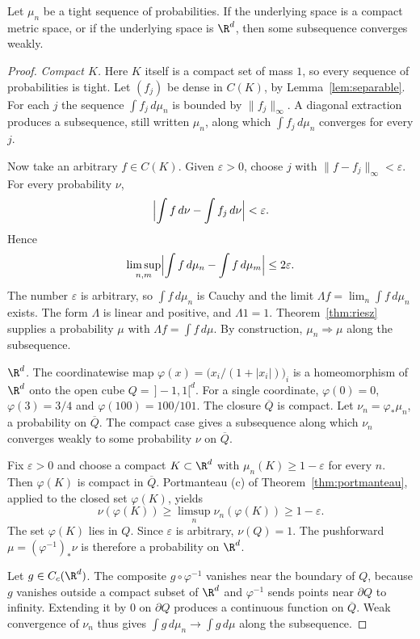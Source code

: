 \begin{theorem}[Prokhorov]\label{thm:prokhorov}
Let $\mu_n$ be a tight sequence of probabilities. If the underlying space is a compact metric space, or if the underlying space is $\R^d$,
then some subsequence converges weakly.
\end{theorem}
\begin{proof}
\emph{Compact $K$.} Here $K$ itself is a compact set of mass $1$, so every sequence of probabilities is tight. Let $(f_j)$ be dense in
$C(K)$, by Lemma~\ref{lem:separable}. For each $j$ the sequence $\int f_j\,d\mu_n$ is bounded by $\|f_j\|_\infty$. A diagonal extraction
produces a subsequence, still written $\mu_n$, along which $\int f_j\,d\mu_n$ converges for every $j$.

Now take an arbitrary $f\in C(K)$. Given $\varepsilon>0$, choose $j$ with $\|f-f_j\|_\infty<\varepsilon$. For every probability $\nu$,
\[\Bigl|\int f\,d\nu-\int f_j\,d\nu\Bigr|<\varepsilon.\]
Hence
\[\limsup_{n,m}\Bigl|\int f\,d\mu_n-\int f\,d\mu_m\Bigr|\le 2\varepsilon.\]
The number $\varepsilon$ is arbitrary, so $\int f\,d\mu_n$ is Cauchy and the limit $\Lambda f=\lim_n\int f\,d\mu_n$ exists. The form $\Lambda$ is
linear and positive, and $\Lambda 1=1$. Theorem~\ref{thm:riesz} supplies a probability $\mu$ with $\Lambda f=\int f\,d\mu$. By construction,
$\mu_n\Rightarrow\mu$ along the subsequence.

\emph{$\R^d$.} The coordinatewise map $\varphi(x)=\bigl(x_i/(1+|x_i|)\bigr)_i$ is a homeomorphism of $\R^d$ onto the open cube
$Q=\,]-1,1[^d$. For a single coordinate, $\varphi(0)=0$, $\varphi(3)=3/4$ and $\varphi(100)=100/101$. The closure $\overline Q$ is compact.
Let $\nu_n=\varphi_*\mu_n$, a probability on $\overline Q$. The compact case gives a subsequence along which $\nu_n$ converges weakly to some
probability $\nu$ on $\overline Q$.

Fix $\varepsilon>0$ and choose a compact $K\subset\R^d$ with $\mu_n(K)\ge 1-\varepsilon$ for every $n$. Then $\varphi(K)$ is compact in $\overline Q$.
Portmanteau (c) of Theorem~\ref{thm:portmanteau}, applied to the closed set $\varphi(K)$, yields
\[\nu(\varphi(K))\ge\limsup_n\nu_n(\varphi(K))\ge 1-\varepsilon.\]
The set $\varphi(K)$ lies in $Q$. Since $\varepsilon$ is arbitrary, $\nu(Q)=1$. The pushforward $\mu=(\varphi^{-1})_*\nu$ is therefore a probability
on $\R^d$.

Let $g\in C_c(\R^d)$. The composite $g\circ\varphi^{-1}$ vanishes near the boundary of $Q$, because $g$ vanishes outside a compact subset of
$\R^d$ and $\varphi^{-1}$ sends points near $\partial Q$ to infinity. Extending it by $0$ on $\partial Q$ produces a continuous function on
$\overline Q$. Weak convergence of $\nu_n$ thus gives $\int g\,d\mu_n\to\int g\,d\mu$ along the subsequence.


\end{proof}
